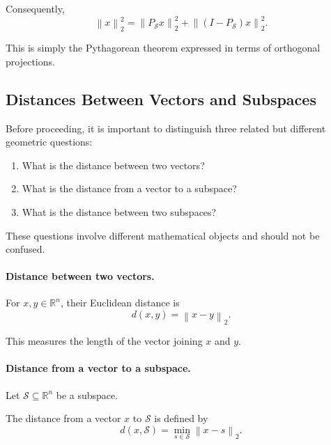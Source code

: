 \documentclass[14pt,letterpaper]{article}
\theoremstyle{plain}
\theoremstyle{definition}
\theoremstyle{remark}
\newcommand{\R}{\mathbb{R}}
\newcommand{\norm}[1]{\left\lVert #1 \right\rVert}
\begin{document}
Consequently,
\[
\boxed{
\norm{x}_2^2
=
\norm{P_{\mathcal S}x}_2^2
+
\norm{(I-P_{\mathcal S})x}_2^2.
}
\]

This is simply the Pythagorean theorem
expressed in terms of orthogonal projections.


\subsection{Distances Between Vectors and Subspaces}
\label{subsec:distance_background}

Before proceeding, it is important to distinguish
three related but different geometric questions:

\begin{enumerate}[label=(\roman*)]

\item What is the distance between two vectors?

\item What is the distance from a vector to a subspace?

\item What is the distance between two subspaces?

\end{enumerate}

These questions involve different mathematical
objects and should not be confused.

\paragraph{Distance between two vectors.}

For $x,y\in\R^n$, their Euclidean distance is
\[
\boxed{
d(x,y)=\norm{x-y}_2.
}
\]

This measures the length of the vector
joining $x$ and $y$.

\paragraph{Distance from a vector to a subspace.}

Let $\mathcal S\subseteq\R^n$ be a subspace.

The distance from a vector $x$ to $\mathcal S$
is defined by
\[
\boxed{
d(x,\mathcal S)
=
\min_{s\in\mathcal S}\norm{x-s}_2.
}
\]
\end{document}
